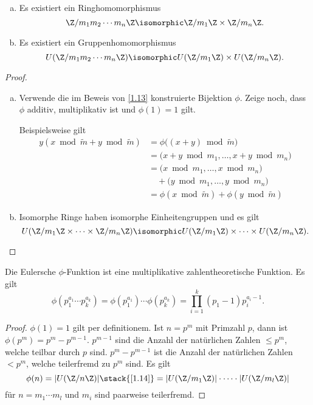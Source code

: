 \begin{st} \label{1.14}
	\begin{enumerate}[a)]
		\item
			Es existiert ein Ringhomomorphismus
			\[
				\Z / m_1m_2 \dotsb m_n \Z
				\isomorphic
				\Z /m_1 \Z \times \Z / m_n \Z.
			\]
		\item
			Es existiert ein Gruppenhomomorphismus
			\[
				U(\Z / m_1 m_2 \dotsb m_n \Z)
				\isomorphic
				U(\Z / m_1 \Z) \times U(\Z / m_n \Z).
			\]
	\end{enumerate}
	\begin{proof}
		\begin{enumerate}[a)]
			\item
				Verwende die im Beweis von \ref{1.13} konstruierte Bijektion $\phi$.
				Zeige noch, dass $\phi$ additiv, multiplikativ ist und $\phi(1) = 1$ gilt.

				Beispielsweise gilt
				\begin{align*}
					y(x \bmod \tilde m + y \bmod \tilde m)
					&= \phi\big( (x+y) \bmod \tilde m \big) \\
					&= \big(x + y \bmod m_1, \dotsc, x + y \bmod m_n \big) \\
					&= \big( x \bmod m_1, \dotsc, x \bmod m_n\big) \\
					&\quad + \big(y \bmod m_1, \dotsc, y \bmod m_n \big) \\
					&= \phi(x \bmod \tilde m) + \phi(y \bmod \tilde m)
				\end{align*}
			\item
				Isomorphe Ringe haben isomorphe Einheitengruppen und es gilt
				\[
					U(\Z / m_1 \Z \times \dotsb \times \Z / m_n \Z)
					\isomorphic U(\Z / m_1 \Z) \times \dotsb \times U(\Z / m_n \Z).
				\]
		\end{enumerate}
	\end{proof}
\end{st}

\begin{kor} \label{1.15}
	Die Eulersche $\phi$-Funktion ist eine multiplikative zahlentheoretische Funktion.
	Es gilt
	\[
		\phi( p_1^{a_1} \dotsb p_k^{a_k} )
		=\phi( p_1^{a_1}) \dotsb \phi(p_k^{a_k})
		= \prod_{i=1}^k (p_1 - 1) p_i^{a_i - 1}.
	\]
	\begin{proof}
		$\phi(1) = 1$ gilt per definitionem.
		Ist $n = p^m$ mit Primzahl $p$, dann ist $\phi(p^m) = p^m - p^{m-1}$.
		$p^{m-1}$ sind die Anzahl der natürlichen Zahlen $\le p^m$, welche teilbar durch $p$ sind.
		$p^m - p^{m-1}$ ist die Anzahl der natürlichen Zahlen $< p^m$, welche teilerfremd zu $p^m$ sind.
		Es gilt
		\[
			\phi(n)
			= | U(\Z / n\Z) |
			\stack{\ref{1.14}}= |U(\Z /m _1 \Z) | \cdot \dotsb \cdot | U(\Z /m_l \Z) |
		\]
		für $n = m_1 \dotsb m_l$ und $m_i$ sind paarweise teilerfremd.
	\end{proof}
\end{kor}

